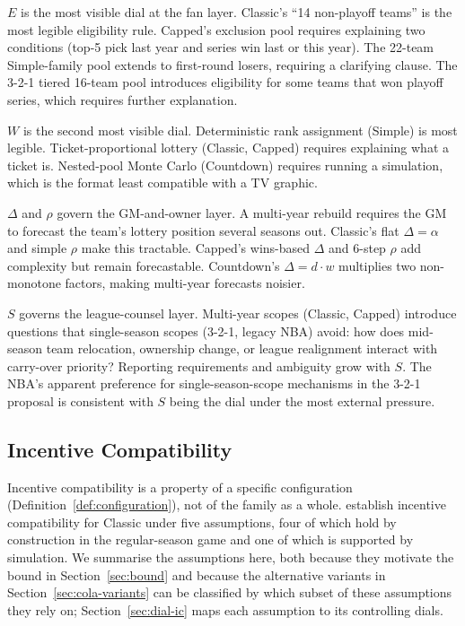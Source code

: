 $E$ is the most visible dial at the fan layer. Classic's ``14 non-playoff teams'' is the most legible eligibility rule. Capped's exclusion pool requires explaining two conditions (top-5 pick last year and series win last or this year). The 22-team Simple-family pool extends to first-round losers, requiring a clarifying clause. The 3-2-1 tiered 16-team pool introduces eligibility for some teams that won playoff series, which requires further explanation.

$W$ is the second most visible dial. Deterministic rank assignment (Simple) is most legible. Ticket-proportional lottery (Classic, Capped) requires explaining what a ticket is. Nested-pool Monte Carlo (Countdown) requires running a simulation, which is the format least compatible with a TV graphic.

$\Delta$ and $\rho$ govern the GM-and-owner layer. A multi-year rebuild requires the GM to forecast the team's lottery position several seasons out. Classic's flat $\Delta = \alpha$ and simple $\rho$ make this tractable. Capped's wins-based $\Delta$ and 6-step $\rho$ add complexity but remain forecastable. Countdown's $\Delta = d \cdot w$ multiplies two non-monotone factors, making multi-year forecasts noisier.

$S$ governs the league-counsel layer. Multi-year scopes (Classic, Capped) introduce questions that single-season scopes (3-2-1, legacy NBA) avoid: how does mid-season team relocation, ownership change, or league realignment interact with carry-over priority? Reporting requirements and ambiguity grow with $S$. The NBA's apparent preference for single-season-scope mechanisms in the 3-2-1 proposal \citep{highley2026threetwoone} is consistent with $S$ being the dial under the most external pressure.

\subsection{Incentive Compatibility}
\label{sec:cola-ic}

Incentive compatibility is a property of a specific configuration (Definition~\ref{def:configuration}), not of the \cola{} family as a whole. \citet{highley2026cola} establish incentive compatibility for Classic \cola{} under five assumptions, four of which hold by construction in the regular-season game and one of which is supported by simulation. We summarise the assumptions here, both because they motivate the bound in Section~\ref{sec:bound} and because the alternative variants in Section~\ref{sec:cola-variants} can be classified by which subset of these assumptions they rely on; Section~\ref{sec:dial-ic} maps each assumption to its controlling dials.

